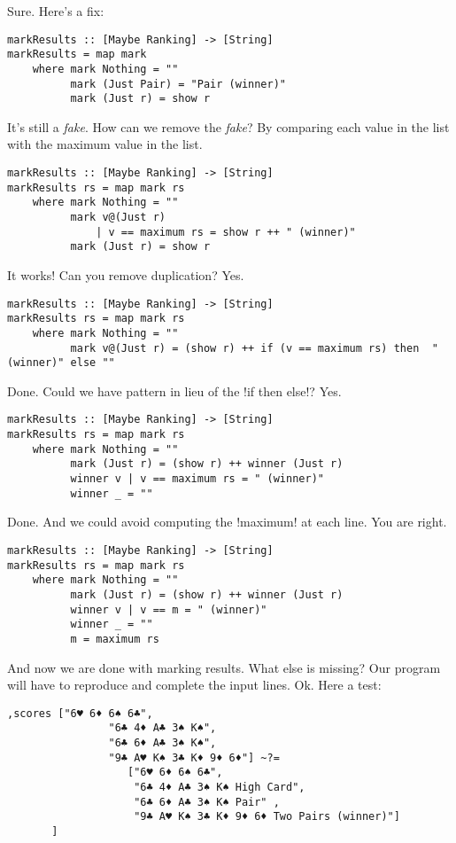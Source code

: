 \lhA \error Sure. Here's a fix:
\begin{lstlisting}[frame=single]
markResults :: [Maybe Ranking] -> [String]
markResults = map mark
    where mark Nothing = ""
          mark (Just Pair) = "Pair (winner)"
          mark (Just r) = show r
\end{lstlisting}
\success It's still a \emph{fake}.
\lhN How can we remove the \emph{fake}?
\lhA By comparing each value in the list with the maximum value in the list.
\begin{lstlisting}[frame=single]
markResults :: [Maybe Ranking] -> [String]
markResults rs = map mark rs
    where mark Nothing = ""
          mark v@(Just r) 
              | v == maximum rs = show r ++ " (winner)" 
          mark (Just r) = show r 
\end{lstlisting}
\success It works!
\lhN Can you remove duplication?
\lhA Yes.
\begin{lstlisting}[frame=single]
markResults :: [Maybe Ranking] -> [String]
markResults rs = map mark rs
    where mark Nothing = ""
          mark v@(Just r) = (show r) ++ if (v == maximum rs) then  " (winner)" else ""
\end{lstlisting}
\success Done.
\lhN Could we have pattern in lieu of the \il!if then else!?
\lhA Yes.
\begin{lstlisting}[frame=single]
markResults :: [Maybe Ranking] -> [String]
markResults rs = map mark rs
    where mark Nothing = ""
          mark (Just r) = (show r) ++ winner (Just r)
          winner v | v == maximum rs = " (winner)"
          winner _ = ""
\end{lstlisting}
\success Done.
\lhN And we could avoid computing the \il!maximum! at each line.
\lhA You are right.
\begin{lstlisting}[frame=single]
markResults :: [Maybe Ranking] -> [String]
markResults rs = map mark rs
    where mark Nothing = ""
          mark (Just r) = (show r) ++ winner (Just r)
          winner v | v == m = " (winner)"
          winner _ = ""
          m = maximum rs
\end{lstlisting}
\success And now we are done with marking results.
\lhN What else is missing?
\lhA Our program will have to reproduce and complete the input lines.
\lhN Ok. Here a test:
\begin{lstlisting}[frame=single]
       ,scores ["6♥ 6♦ 6♠ 6♣",
                "6♣ 4♦ A♣ 3♠ K♠",
                "6♣ 6♦ A♣ 3♠ K♠",
                "9♣ A♥ K♠ 3♣ K♦ 9♦ 6♦"] ~?= 
                   ["6♥ 6♦ 6♠ 6♣",
                    "6♣ 4♦ A♣ 3♠ K♠ High Card",
                    "6♣ 6♦ A♣ 3♠ K♠ Pair" ,
                    "9♣ A♥ K♠ 3♣ K♦ 9♦ 6♦ Two Pairs (winner)"]
       ]
\end{lstlisting}
